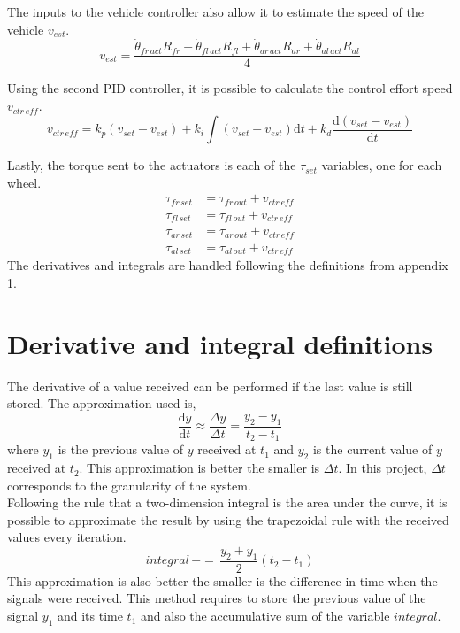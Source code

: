\documentclass[table,xcdraw]{article}
\begin{document}
The inputs to the vehicle controller also allow it to estimate the speed of the vehicle $v_{est}$.
\begin{equation}
    v_{est} = \frac{\dot{\theta}_{fr\,act} R_{fr} + \dot{\theta}_{fl\,act} R_{fl} + \dot{\theta}_{ar\,act} R_{ar} + \dot{\theta}_{al\,act} R_{al}}{4}
\end{equation}

Using the second PID controller, it is possible to calculate the control effort speed $v_{ctr\,eff}$.
\begin{equation}
    v_{ctr\,eff} = k_p(v_{set} - v_{est}) + k_i\int{(v_{set} - v_{est})\textrm{d}t} + k_d \frac{\textrm{d}(v_{set} - v_{est})}{\textrm{d}t}
\end{equation}

Lastly, the torque sent to the actuators is each of the $\tau_{set}$ variables, one for each wheel.
\begin{equation}
\begin{split}
    \tau_{fr\,set} & = \tau_{fr\,out} + v_{ctr\,eff}\\
    \tau_{fl\,set} & = \tau_{fl\,out} + v_{ctr\,eff}\\
    \tau_{ar\,set} & = \tau_{ar\,out} + v_{ctr\,eff}\\
    \tau_{al\,set} & = \tau_{al\,out} + v_{ctr\,eff}
\end{split}
\end{equation}
The derivatives and integrals are handled following the definitions from appendix \ref{app:der_int_def}.


\newpage
\section{Derivative and integral definitions}\label{app:der_int_def}
The derivative of a value received can be performed if the last value is still stored. The approximation used is,
\begin{equation*}
    \frac{\textrm{d} y}{\textrm{d} t} \approx \frac{\Delta y}{\Delta t} = \frac{y_2-y_1}{t_2-t_1}
\end{equation*}
where $y_1$ is the previous value of $y$ received at $t_1$ and $y_2$ is the current value of $y$ received at $t_2$. This approximation is better the smaller is $\Delta t$. In this project, $\Delta t$ corresponds to the granularity of the system.\\

Following the rule that a two-dimension integral is the area under the curve, it is possible to approximate the result by using the trapezoidal rule with the received values every iteration.
\begin{equation*}
    integral\, +=\, \frac{y_2 + y_1}{2}(t_2 - t_1)
\end{equation*}
This approximation is also better the smaller is the difference in time when the signals were received. This method requires to store the previous value of the signal $y_1$ and its time $t_1$ and also the accumulative sum of the variable $integral$.\\
\end{document}
